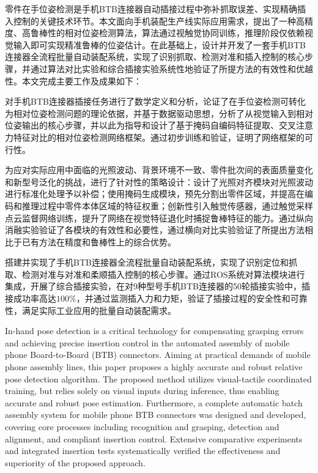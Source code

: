 \documentclass{Diploma}
\begin{document}
\ChsAbstract 零件在手位姿检测是手机BTB连接器自动插接过程中弥补抓取误差、实现精确插入控制的关键技术环节。本文面向手机装配生产线实际应用需求，提出了一种高精度、高鲁棒性的相对位姿检测算法，算法通过视触觉协同训练，推理阶段仅依赖视觉输入即可实现精准鲁棒的位姿估计。在此基础上，设计并开发了一套手机BTB连接器全流程批量自动装配系统，实现了识别抓取、检测对准和插入控制的核心步骤，并通过算法对比实验和综合插接实验系统性地验证了所提方法的有效性和优越性。本文完成主要工作及成果如下：

对手机BTB连接器插接任务进行了数学定义和分析，论证了在手位姿检测可转化为相对位姿检测问题的理论依据，并基于数据驱动思想，分析了从视觉输入到相对位姿输出的核心步骤，并以此为指导和设计了基于掩码自编码特征提取、交叉注意力特征对比的相对位姿检测网络框架。通过初步训练和验证，证明了网络框架的可行性。

为应对实际应用中面临的光照波动、背景环境不一致、零件批次间的表面质量变化和新型号泛化的挑战，进行了针对性的策略设计：设计了光照对齐模块对光照波动进行标准化处理予以补偿；使用掩码生成模块，预先分割出零件区域，并提高在编码和推理过程中零件本体区域的特征权重；创新性引入触觉传感器，通过触觉采样点云监督网络训练，提升了网络在视觉特征退化时捕捉鲁棒特征的能力。通过纵向消融实验验证了各模块的有效性和必要性，通过横向对比实验验证了所提出方法相比于已有方法在精度和鲁棒性上的综合优势。

搭建并实现了手机BTB连接器全流程批量自动装配系统，实现了识别定位和抓取、检测对准与对准和柔顺插入控制的核心步骤。通过ROS系统对算法模块进行集成，开展了综合插接实验，在对9种型号手机BTB连接器的50轮插接实验中，插接成功率高达$100\%$，并通过监测插入力和力矩，验证了插接过程的安全性和可靠性，满足实际工业应用的批量自动装配需求。


\EngAbstract
In-hand pose detection is a critical technology for compensating grasping errors and achieving precise insertion control in the automated assembly of mobile phone Board-to-Board (BTB) connectors. Aiming at practical demands of mobile phone assembly lines, this paper proposes a highly accurate and robust relative pose detection algorithm. The proposed method utilizes visual-tactile coordinated training, but relies solely on visual inputs during inference, thus enabling accurate and robust pose estimation. Furthermore, a complete automatic batch assembly system for mobile phone BTB connectors was designed and developed, covering core processes including recognition and grasping, detection and alignment, and compliant insertion control. Extensive comparative experiments and integrated insertion tests systematically verified the effectiveness and superiority of the proposed approach.
\end{document}
